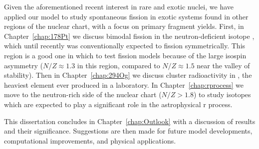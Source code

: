 Given the aforementioned recent interest in rare and exotic nuclei, we have applied our model to study spontaneous fission in exotic systems found in other regions of the nuclear chart, with a focus on primary fragment yields. First, in Chapter~\ref{chap:178Pt} we discuss bimodal fission in the neutron-deficient isotope {\Pt}, which until recently was conventionally expected to fission symmetrically. This region is a good one in which to test fission models because of the large isospin asymmetry ($N/Z\approx1.3$ in this region, compared to $N/Z\approx1.5$ near the valley of stability). Then in Chapter~\ref{chap:294Og} we discuss cluster radioactivity in {\Og}, the heaviest element ever produced in a laboratory. In Chapter~\ref{chap:rprocess} we move to the neutron-rich side of the nuclear chart ($N/Z>1.8$) to study isotopes which are expected to play a significant role in the astrophysical r process. %



This dissertation concludes in Chapter~\ref{chap:Outlook} with a discussion of results and their significance. Suggestions are then made for future model developments, computational improvements, and physical applications.
